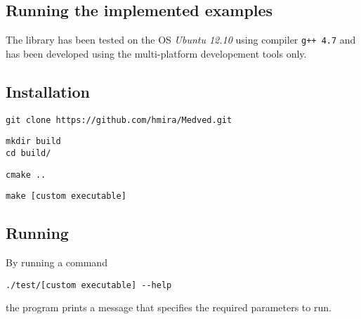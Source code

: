 \begin{appendices}

\chapter{Running the implemented examples}

The library has been tested on the OS \emph{Ubuntu 12.10} using compiler \texttt{g++ 4.7}
and has been developed using the multi-platform developement tools only.



\section{Installation}

\begin{lstlisting}
git clone https://github.com/hmira/Medved.git
\end{lstlisting}

\begin{lstlisting}
mkdir build
cd build/
\end{lstlisting}

\begin{lstlisting}
cmake ..
\end{lstlisting}

\begin{lstlisting}
make [custom executable]
\end{lstlisting}

\section{Running}

By running a command

\begin{lstlisting}
./test/[custom executable] --help
\end{lstlisting}
the program prints a message that specifies the required parameters to run.


\end{appendices}
